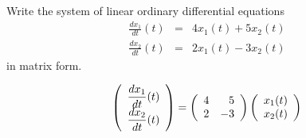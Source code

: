 \documentclass{ximera}
\begin{document}
\begin{exercise} \label{c4.1.5}
Write the system of linear ordinary differential equations
\begin{eqnarray*}
\frac{dx_1}{dt}(t) & = & 4x_1(t) + 5x_2(t) \\
\frac{dx_2}{dt}(t) & = & 2x_1(t) - 3x_2(t)
\end{eqnarray*}
in matrix form.

\begin{solution}
\ans
\arraystart
\[
\left(\begin{array}{r} \displaystyle\frac{dx_1}{dt}(t) \\ 
\displaystyle\frac{dx_2}{dt}(t)\end{array}\right) =
\left(\begin{array}{rr} 4 & 5 \\ 2 & -3\end{array}\right)
\left(\begin{array}{r} x_1(t) \\ x_2(t)\end{array}\right)
\]
\arrayfinish

\end{solution}
\end{exercise}
\end{document}
